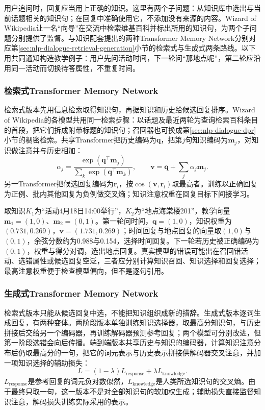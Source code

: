用户追问时，回复应当用上正确的知识。这里有两个子问题：从知识库中选出与当前话题相关的知识句；在回复中准确使用它，不添加没有来源的内容。Wizard of Wikipedia让一名“向导”在交流中检索维基百科并标出所用的知识句，为两个子问题分别提供了监督。与知识配套提出的两种Transformer Memory Network分别对应第\ref{sec:nlp-dialogue-retrieval-generation}小节的检索式与生成式两条路线。以下用共同通知构造教学例子：用户先问活动时间，下一轮问“那地点呢”，第二轮应沿用同一活动而切换待答属性，不重复时间。

\subsubsection{检索式Transformer Memory Network}
\label{sec:nlp-dialogue-retrieval-memory}

检索式版本先用信息检索取得知识句，再据知识和历史给候选回复排序。Wizard of Wikipedia的各模型共用同一检索步骤：以话题及最近两轮为查询检索百科条目的首段，把它们拆成附带标题的知识句；召回器也可换成第\ref{sec:nlp-dialogue-dpr}小节的稠密检索。共享Transformer把历史编码为$\bm{q}$，把第$j$句知识编码为$\bm{m}_j$，对知识做注意并与历史相加：
\begin{equation}
 \alpha_j=\frac{\exp(\bm{q}^{\top}\bm{m}_j)}
                  {\sum_k\exp(\bm{q}^{\top}\bm{m}_k)},
 \qquad
 \bm{v}=\bm{q}+\sum_j\alpha_j\bm{m}_j.
 \label{eq:nlp-dialogue-retrieval-memory}
\end{equation}
另一Transformer把候选回复编码为$\bm{r}_l$，按$\cos(\bm{v},\bm{r}_l)$取最高者。训练以正确回复为正例、批内其他回复为负例做交叉熵；知识注意权重在回复目标下间接学习。

取知识$K_1$为“活动4月18日14:00举行”，$K_2$为“地点海棠楼201”，教学向量$\bm{m}_1=(1,0)$、$\bm{m}_2=(0,1)$。第一轮问时间，$\bm{q}=(1,0)$，知识权重为$(0.731,0.269)$，$\bm{v}=(1.731,0.269)$；时间回复与地点回复的向量取$(1,0)$与$(0,1)$，余弦分数约为0.988与0.154，选择时间回复。下一轮若历史被正确编码为$(0,1)$，权重与得分对调，选出地点回复。真实模型的错误可能出在召回错活动、选错属性或候选回复空泛，三者应分别计算知识召回、知识选择和回复选择；最高注意权重便于检查模型偏向，但不是逐句引用。

\subsubsection{生成式Transformer Memory Network}
\label{sec:nlp-dialogue-generative-memory}

检索式版本只能从候选回复中选，不能把知识组织成新的措辞。生成式版本逐词生成回复，有两种变体。两阶段版本单独训练知识选择器，取最高分知识句，与历史拼接后交给另一个编码器，再训练解码器预测参考回复；两个模型可分别改进，但第一阶段选错会向后传播。端到端版本共享历史与知识的编码器，计算知识注意分布后仍取最高分的一句，把它的词元表示与历史表示拼接供解码器交叉注意，并加一项知识选择的辅助损失：
\begin{equation}
 L=(1-\lambda)L_{\mathrm{response}}+\lambda L_{\mathrm{knowledge}}.
 \label{eq:nlp-dialogue-generative-memory}
\end{equation}
$L_{\mathrm{response}}$是参考回复的词元负对数似然，$L_{\mathrm{knowledge}}$是人类所选知识句的交叉熵。由于最终只取一句，这一版本不是对全部知识句的软加权生成；辅助损失直接监督知识注意，解码损失训练实际采用的表示。

